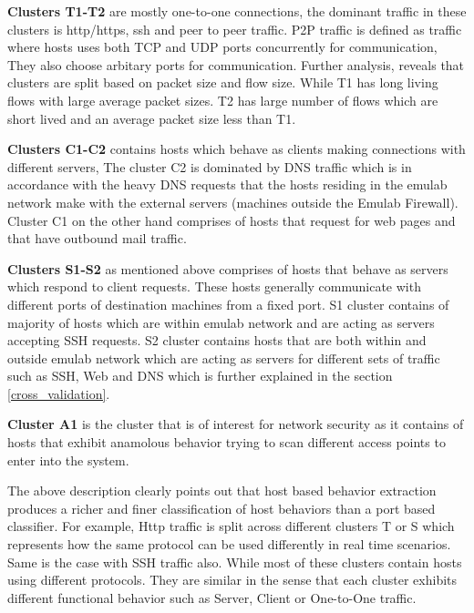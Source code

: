 \textbf{Clusters T1-T2} are mostly one-to-one connections, the dominant traffic in these clusters is http/https, ssh and peer to peer traffic. P2P traffic is defined as traffic where hosts uses both TCP and UDP ports concurrently for communication, They also choose arbitary ports for communication. Further analysis, reveals that clusters are split based on packet size and flow size.
While T1 has long living flows with large average packet sizes. T2 has large number of flows which are short lived and an average packet size less than T1.

\textbf{Clusters C1-C2} contains hosts which behave as clients  making connections with different servers, The cluster C2 is dominated by DNS traffic which is in accordance with the heavy DNS requests that the hosts residing in the emulab network make with the external servers (machines outside the Emulab Firewall). Cluster C1 on the other hand comprises of hosts that request for web pages and that have outbound mail traffic.

\textbf{Clusters S1-S2} as mentioned above comprises of hosts that behave as servers which respond to client requests. These hosts generally communicate with different ports of destination machines from a fixed port. S1 cluster contains of majority of hosts which are within emulab network and are acting as servers accepting SSH requests. S2 cluster contains hosts that are both within and outside emulab network which are acting as servers for different sets of traffic such as SSH, Web and DNS which is further explained in the section \ref{cross_validation}. 

\textbf{Cluster A1} is the cluster that is of interest for network security as it contains of hosts that exhibit anamolous behavior trying to scan different access points to enter into the system.

The above description clearly points out that host based behavior extraction produces a richer and finer classification of host behaviors than a port based classifier. For example, Http traffic is split across different clusters T or S which represents how the same protocol can be used differently in real time scenarios. Same is the case with SSH traffic also. While most of these clusters contain hosts using different protocols. They are similar in the sense that each cluster exhibits different functional behavior such as Server, Client or One-to-One traffic.

